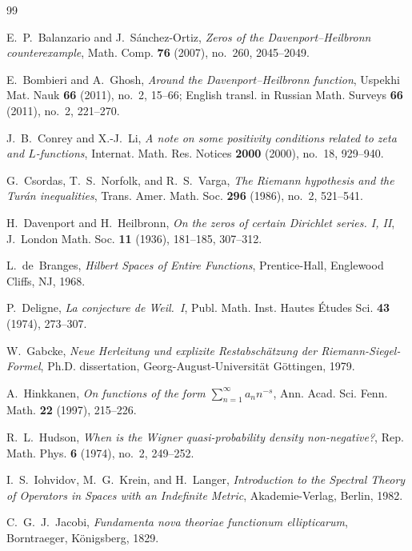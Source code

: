 \documentclass[11pt,reqno]{amsart}
\theoremstyle{definition}
\theoremstyle{remark}
\numberwithin{equation}{section}
\begin{document}
\begin{thebibliography}{99}

E.~P.~Balanzario and J.~S\'anchez-Ortiz,
\emph{Zeros of the Davenport--Heilbronn counterexample},
Math. Comp. \textbf{76} (2007), no.~260, 2045--2049.

E.~Bombieri and A.~Ghosh,
\emph{Around the Davenport--Heilbronn function},
Uspekhi Mat. Nauk \textbf{66} (2011), no.~2, 15--66; English transl. in Russian Math. Surveys \textbf{66} (2011), no.~2, 221--270.

J.~B.~Conrey and X.-J.~Li,
\emph{A note on some positivity conditions related to zeta and $L$-functions},
Internat. Math. Res. Notices \textbf{2000} (2000), no.~18, 929--940.

G.~Csordas, T.~S.~Norfolk, and R.~S.~Varga,
\emph{The Riemann hypothesis and the Tur\'an inequalities},
Trans. Amer. Math. Soc. \textbf{296} (1986), no.~2, 521--541.

H.~Davenport and H.~Heilbronn,
\emph{On the zeros of certain Dirichlet series. I, II},
J.~London Math. Soc. \textbf{11} (1936), 181--185, 307--312.

L.~de~Branges,
\emph{Hilbert Spaces of Entire Functions},
Prentice-Hall, Englewood Cliffs, NJ, 1968.

P.~Deligne,
\emph{La conjecture de Weil.~I},
Publ. Math. Inst. Hautes \'Etudes Sci. \textbf{43} (1974), 273--307.

W.~Gabcke,
\emph{Neue Herleitung und explizite Restabsch\"atzung der Riemann-Siegel-Formel},
Ph.D. dissertation, Georg-August-Universit\"at G\"ottingen, 1979.

A.~Hinkkanen,
\emph{On functions of the form $\sum_{n=1}^{\infty} a_n n^{-s}$},
Ann. Acad. Sci. Fenn. Math. \textbf{22} (1997), 215--226.

R.~L.~Hudson,
\emph{When is the Wigner quasi-probability density non-negative?},
Rep. Math. Phys. \textbf{6} (1974), no.~2, 249--252.

I.~S.~Iohvidov, M.~G.~Krein, and H.~Langer,
\emph{Introduction to the Spectral Theory of Operators in Spaces with an Indefinite Metric},
Akademie-Verlag, Berlin, 1982.

C.~G.~J.~Jacobi,
\emph{Fundamenta nova theoriae functionum ellipticarum},
Borntraeger, K\"onigsberg, 1829.


\end{thebibliography}
\end{document}

